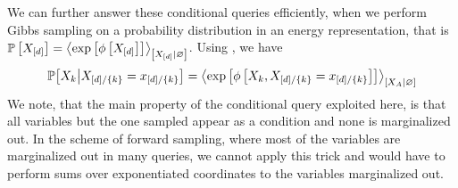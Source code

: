 We can further answer these conditional queries efficiently, when we perform Gibbs sampling on a probability distribution in an energy representation, that is $\mathbb{P}\left[X_{[d]}\right]=\left\langle \mathrm{exp}\left[\phi\left[X_{[d]}\right]\right]\right\rangle_{\left[ X_{[d]} | \varnothing \right]}$.
Using , we have
\begin{align*}
    \mathbb{P}\big[X_{k}\big|X_{[d]/\{k\}}=x_{[d]/\{k\}}\big]
    = \left\langle \mathrm{exp}\left[\phi\left[X_{k},X_{[d]/\{k\}}=x_{[d]/\{k\}}\right]\right]
    \right\rangle_{\left[ X_{A} | \varnothing \right]}
\end{align*}
We note, that the main property of the conditional query exploited here, is that all variables but the one sampled appear as a condition and none is marginalized out.
In the scheme of forward sampling, where most of the variables are marginalized out in many queries, we cannot apply this trick and would have to perform sums over exponentiated coordinates to the variables marginalized out.


\label{sec:simulatedAnnealing}

